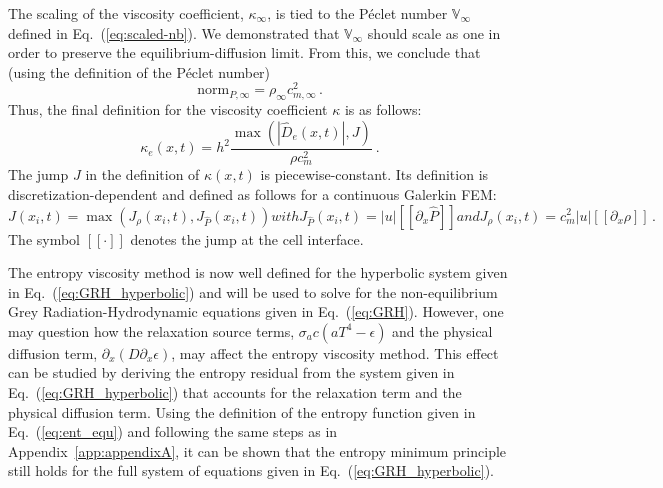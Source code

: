 \documentclass[review]{elsarticle}
\newcommand{\eqt}[1]{Eq.~(\ref{#1})}                     %
\newcommand{\app}[1]{Appendix~\ref{#1}}                     %
\newcommand{\norm}{\textrm{norm}}
\newcommand{\Pe}{\textrm{P\'e}}
\renewcommand{\Pe}{\mathbb{V}_\infty}
\begin{document}
%
The scaling of the viscosity coefficient, $\kappa_\infty$, is tied to the P\'eclet number $\Pe$ defined in \eqt{eq:scaled-nb}. We demonstrated that $\Pe$ should scale as one in order to preserve the equilibrium-diffusion limit. From this, we conclude that (using the definition of the P\'eclet number) 
%
\begin{equation}
\norm_{P,\infty} = \rho_\infty c^2_{m,\infty} \nonumber \,.
\end{equation}
%
Thus, the final definition for the viscosity coefficient $\kappa$ is as follows:
\begin{equation}
\label{eq:equation12bis}
\kappa_e(x,t) = h^2 \frac{\max (|\hat{D}_e(x,t)|, J)}{\rho c_m^2} \ .
\end{equation} 
The jump $J$ in the definition of $\kappa(x,t)$ is piecewise-constant. Its definition is discretization-dependent and defined as follows for a continuous Galerkin FEM: 
\begin{subequations}
\label{eq:equation12ter}
\begin{equation}
J(x_i,t) = \max( J_{\rho}(x_i,t), J_{\hat{P}}(x_i,t) )
\end{equation}
with
\begin{equation}
J_{\hat{P}}(x_i,t) = |u| [[\partial_x \hat{P}]]
\end{equation}
and
\begin{equation}
J_{\rho}(x_i,t) = c_m^2 |u|  [[\partial_x \rho]] \,.
\end{equation}
\end{subequations}
The symbol $[[ \cdot ]]$ denotes the jump at the cell interface.

The entropy viscosity method is now well defined for the hyperbolic system given in \eqt{eq:GRH_hyperbolic} and will be used to solve for the non-equilibrium Grey Radiation-Hydrodynamic equations given in \eqt{eq:GRH}. However, one may question how the relaxation source terms, $\sigma_a c (a T^4-\epsilon)$ and the physical diffusion term, $\partial_x(D\partial_x \epsilon)$, may affect the entropy viscosity method. This effect can be studied by deriving the entropy residual from the system given in \eqt{eq:GRH_hyperbolic} that accounts for the relaxation term and the physical diffusion term. Using the definition of the entropy function given in \eqt{eq:ent_equ} and following the same steps as in \app{app:appendixA}, it can be shown that the entropy minimum principle still holds for the full system of equations given in \eqt{eq:GRH_hyperbolic}.
\end{document}
